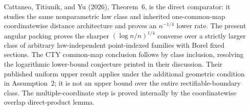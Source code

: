Cattaneo, Titiunik, and Yu (2026), Theorem~6, is the direct comparator: it studies the same nonparametric law class and inherited one-common-map coordinatewise distance architecture and proves an \(n^{-1/4}\) lower rate.  The present angular packing proves the sharper \((\log n/n)^{1/4}\) converse over a strictly larger class of arbitrary law-independent point-indexed families with Borel fixed sections.  The CTY common-map conclusion follows by class inclusion, resolving the logarithmic lower-bound conjecture printed in their discussion.  Their published uniform upper result applies under the additional geometric condition in Assumption~2; it is not an upper bound over the entire rectifiable-boundary class.  The multiple-coordinate step is proved internally by the coordinatewise overlap direct-product lemma.